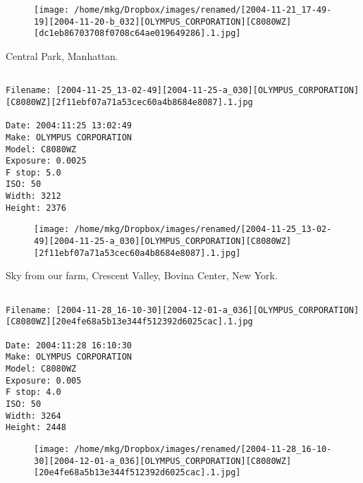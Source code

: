 \begin{figure}
\texttt{[image: /home/mkg/Dropbox/images/renamed/[2004-11-21\_17-49-19][2004-11-20-b\_032][OLYMPUS\_CORPORATION][C8080WZ][dc1eb86703708f0708c64ae019649286].1.jpg]}
\end{figure}
    
\clearpage
\onecolumn
\noindent Central Park, Manhattan.
\noindent
\begin{lstlisting}

Filename: [2004-11-25_13-02-49][2004-11-25-a_030][OLYMPUS_CORPORATION][C8080WZ][2f11ebf07a71a53cec60a4b8684e8087].1.jpg

Date: 2004:11:25 13:02:49
Make: OLYMPUS CORPORATION
Model: C8080WZ
Exposure: 0.0025
F stop: 5.0
ISO: 50
Width: 3212
Height: 2376
\end{lstlisting}
\clearpage

\begin{figure}
\texttt{[image: /home/mkg/Dropbox/images/renamed/[2004-11-25\_13-02-49][2004-11-25-a\_030][OLYMPUS\_CORPORATION][C8080WZ][2f11ebf07a71a53cec60a4b8684e8087].1.jpg]}
\end{figure}
    
\clearpage
\onecolumn
\noindent Sky from our farm, Crescent Valley, Bovina Center, New York.
\noindent
\begin{lstlisting}

Filename: [2004-11-28_16-10-30][2004-12-01-a_036][OLYMPUS_CORPORATION][C8080WZ][20e4fe68a5b13e344f512392d6025cac].1.jpg

Date: 2004:11:28 16:10:30
Make: OLYMPUS CORPORATION
Model: C8080WZ
Exposure: 0.005
F stop: 4.0
ISO: 50
Width: 3264
Height: 2448
\end{lstlisting}
\clearpage

\begin{figure}
\texttt{[image: /home/mkg/Dropbox/images/renamed/[2004-11-28\_16-10-30][2004-12-01-a\_036][OLYMPUS\_CORPORATION][C8080WZ][20e4fe68a5b13e344f512392d6025cac].1.jpg]}
\end{figure}
    

